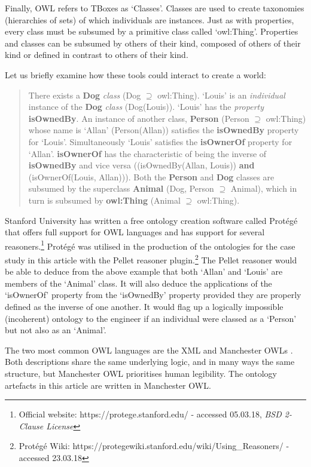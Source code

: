 \documentclass[titlepage,a4paper,12pt,oneside]{book}
\begin{document}
Finally, OWL refers to TBoxes as `Classes'.
Classes are used to create taxonomies (hierarchies of sets) of which individuals are instances.
Just as with properties, every class must be subsumed by a primitive class called `owl:Thing'. 
Properties and classes can be subsumed by others of their kind, composed of others of their kind or defined in contrast to others of their kind.\par
Let us briefly examine how these tools could interact to create a world:
\begin{quote}
  There exists a \textbf{Dog} \textit{class} (Dog \(\supseteq\) owl:Thing). `Louis' is an \textit{individual} instance of the \textbf{Dog} \textit{class} (Dog(Louis)). `Louis' has the \textit{property} \textbf{isOwnedBy}. An instance of another class, \textbf{Person} (Person \(\supseteq\) owl:Thing) whose name is `Allan' (Person(Allan)) satisfies the \textbf{isOwnedBy} property for `Louis'. Simultaneously `Louis' satisfies the \textbf{isOwnerOf} property for `Allan'. \textbf{isOwnerOf} has the characteristic of being the inverse of \textbf{isOwnedBy} and vice versa ((isOwnedBy(Allan, Louis)) \textbf{and} (isOwnerOf(Louis, Allan))). Both the \textbf{Person} and \textbf{Dog} classes are subsumed by the superclass \textbf{Animal} (Dog, Person \(\supseteq\) Animal), which in turn is subsumed by \textbf{owl:Thing} (Animal \(\supseteq\) owl:Thing).
\end{quote}
Stanford University has written a free ontology creation software called Protégé that offers full support for OWL languages and has support for several reasoners.\footnote{Official website: https://protege.stanford.edu/ - accessed 05.03.18, \textit{BSD 2-Clause License}}
Protégé was utilised in the production of the ontologies for the case study in this article with the Pellet reasoner plugin.\footnote{Protégé Wiki: https://protegewiki.stanford.edu/wiki/Using\_Reasoners/ - accessed 23.03.18}
The Pellet reasoner would be able to deduce from the above example that both `Allan' and `Louis' are members of the `Animal' class.
It will also deduce the applications of the `isOwnerOf' property from the `isOwnedBy' property provided they are properly defined as the inverse of one another.
It would flag up a logically impossible (incoherent) ontology to the engineer if an individual were classed as a `Person' but not also as an `Animal'.\par
The two most common OWL languages are the XML and Manchester OWLs \cite[30]{handbookIntro2003}\cite[10]{guide2011}.
Both descriptions share the same underlying logic, and in many ways the same structure, but Manchester OWL prioritises human legibility.
The ontology artefacts in this article are written in Manchester OWL.
\end{document}
